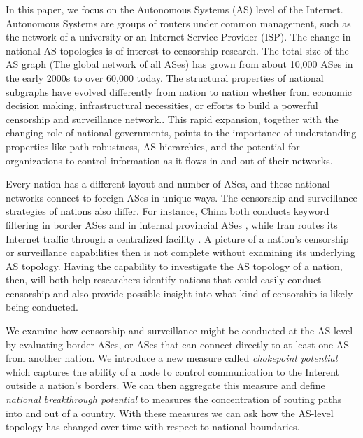 \par
In this paper, we focus on the Autonomous Systems (AS) level of the Internet.
Autonomous Systems are groups of routers under common management, such as the network of
a university or an Internet Service Provider (ISP). The change in national AS topologies 
is of interest to censorship research. The total size of the AS graph (The global network 
of all ASes) has grown from about 10,000 ASes in the early 2000s to over 60,000 today. 
The structural properties of national subgraphs have evolved differently
from nation to nation whether from economic decision making, infrastructural necessities, 
or efforts to build a powerful censorship and surveillance network..
This rapid expansion, together with the changing role of national
governments, points to the importance of understanding properties like
path robustness, AS hierarchies, and the potential for organizations to
control information as it flows in and out of their networks.

\par Every nation has a different layout and number of ASes, and these national networks
connect to foreign ASes in unique ways. The
censorship and surveillance strategies of nations also differ. For
instance, China both conducts keyword filtering in border ASes and in
internal provincial ASes \cite{chinafiltering}, while Iran routes its
Internet traffic through a centralized facility \cite{irancensor}.
A picture of a nation's censorship or surveillance capabilities then
is not complete without examining its underlying AS topology.
Having the capability to investigate the AS topology of a nation, then, will both help
researchers identify nations that could easily conduct censorship and
also provide possible insight into what kind of censorship is likely
being conducted. 

We examine how censorship and surveillance might be conducted 
at the AS-level by evaluating border ASes, or ASes that can connect directly to at least
one AS from another nation. We introduce a new measure called \emph{chokepoint potential} which
captures the ability of a node to control communication to the Interent outside a nation's borders.
We can then aggregate this measure and define \emph{national breakthrough potential} to
measures the concentration of routing paths into and out of a country. 
With these measures 
we can ask how the AS-level topology has changed over time with respect
to national boundaries. 

